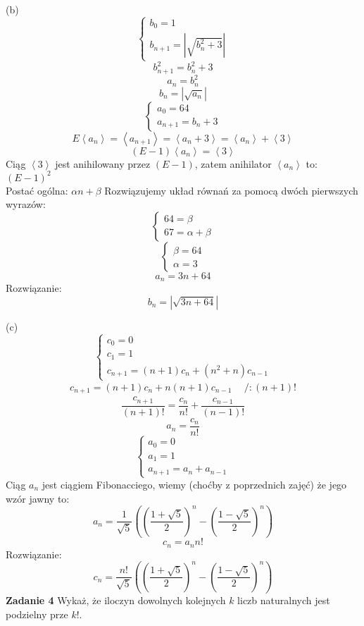 \documentclass[12pt,a4paper]{article}
\begin{document}
\newpage
(b)
\[
	\left\{ 
	\begin{array}{l}
		b_0 = 1 \\
		b_{n + 1 } = \left\lvert \sqrt{b_{n}^2 + 3} \right\rvert
	\end{array} 
	\right.
\]
\[
 b_{n + 1}^2 =  b_{n}^2 + 3
\]
\[
 a_n = b_n^2
\]
\[
 b_n = \left\lvert \sqrt{a_n} \right\rvert
\]
\[
	\left\{ 
	\begin{array}{l}
		a_0 = 64 \\
		a_{n+1} = b_{n} + 3 
	\end{array} 
	\right.
\]
\[
	E \left< a_n \right> = \left< a_{n+1} \right> = \left< a_n + 3 \right> 
	= \left< a_n \right> + \left< 3 \right>
\]
\[
	(E - 1) \left< a_n \right> = \left< 3 \right>
\]
Ciąg \( \left< 3 \right> \) jest anihilowany przez \( (E - 1) \), zatem anihilator \( \left< a_n \right> \) to: 
\( (E - 1)^2  \) \\
Postać ogólna: \( \alpha n + \beta \)
Rozwiązujemy układ równań za pomocą dwóch pierwszych wyrazów:
\[
	\left\{ 
	\begin{array}{lll}
		64 = \beta \\
		67 = \alpha + \beta
	\end{array} 
	\right.
\]
\[
	\left\{ 
	\begin{array}{lll}
		\beta = 64 \\
		\alpha = 3
	\end{array} 
	\right.
\]
\[
	a_n = 3n + 64
\]
Rozwiązanie:
\[
	b_n = \left\lvert \sqrt{3n + 64} \right\rvert
\]

(c)
\[
	\left\{ 
	\begin{array}{l}
		c_0 = 0 \\
		c_1 = 1 \\
		c_{n + 1} = (n + 1)c_n + (n^2 + n)c_{n-1}
	\end{array} 
	\right.
\]
\[
	\begin{array}{lr}
		 c_{n + 1} = (n + 1)c_n + n(n + 1)c_{n-1} & \ \ /:(n+1)!
	\end{array}
\]
\[
	\frac{c_{n+1}}{(n+1)!} = \frac{c_{n}}{n!} + \frac{c_{n-1}}{(n-1)!}
\]
\[
	a_n = \frac{c_n}{n!}
\]
\[
	\left\{ 
	\begin{array}{l}
		a_0 = 0 \\
		a_1 = 1 \\
		a_{n + 1} = a_n + a_{n-1}
	\end{array} 
	\right.
\]
Ciąg \( a_n \)  jest ciągiem Fibonacciego, wiemy (choćby z poprzednich zajęć) że jego wzór jawny to:
\[
	a_n = 
	\frac{1}{\sqrt{5}}
	\left(
	\left(\frac{1 + \sqrt{5}}{2}\right)^n 
	- \left(\frac{1 - \sqrt{5}}{2}\right)^n
	\right)
\]
\[
	c_n = a_n n!
\]
Rozwiązanie:
\[
	c_n = \frac{n!}{\sqrt{5}}
	\left(
	\left(\frac{1 + \sqrt{5}}{2}\right)^n 
	- \left(\frac{1 - \sqrt{5}}{2}\right)^n
	\right)
\]
\newpage
\noindent
\textbf{Zadanie 4} Wykaż, że iloczyn dowolnych kolejnych \(k\) liczb naturalnych jest podzielny prze \(k!\).
\vskip 0.1cm
\end{document}
